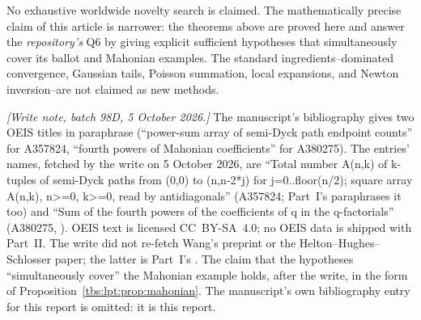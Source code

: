 \documentclass[11pt,a4paper]{article}
\numberwithin{equation}{section}
\theoremstyle{definition}
\begin{document}
No exhaustive worldwide novelty search is claimed. The mathematically
precise claim of this article is narrower: the theorems above are proved
here and answer the \emph{repository's} Q6 by giving explicit sufficient
hypotheses that simultaneously cover its ballot and Mahonian examples.
The standard ingredients--dominated convergence, Gaussian tails, Poisson
summation, local expansions, and Newton inversion--are not claimed as new
methods.

\emph{[Write note, batch 98D, 5 October 2026.]} The manuscript's
bibliography gives two OEIS titles in paraphrase (``power-sum array of
semi-Dyck path endpoint counts'' for A357824, ``fourth powers of Mahonian
coefficients'' for A380275). The entries' names, fetched by the write on
5 October 2026, are ``Total number A(n,k) of k-tuples of semi-Dyck paths
from (0,0) to (n,n-2*j) for j=0..floor(n/2); square array A(n,k), n>=0,
k>=0, read by antidiagonals'' (A357824; Part~I's \cite{oeisarray}
paraphrases it too) and ``Sum of the fourth powers of the coefficients of
q in the q-factorials'' (A380275, \cite{lptA380275}). OEIS text is
licensed CC~BY-SA~4.0; no OEIS data is shipped with Part~II. The write did not
re-fetch Wang's preprint or the Helton--Hughes--Schlosser paper; the
latter is Part~I's \cite{discretelaplace}. The claim that the hypotheses
``simultaneously cover'' the Mahonian example holds, after the write, in
the form of Proposition~\ref{tbs:lpt:prop:mahonian}. The manuscript's own
bibliography entry for this report is omitted: it is this report.
\end{document}
